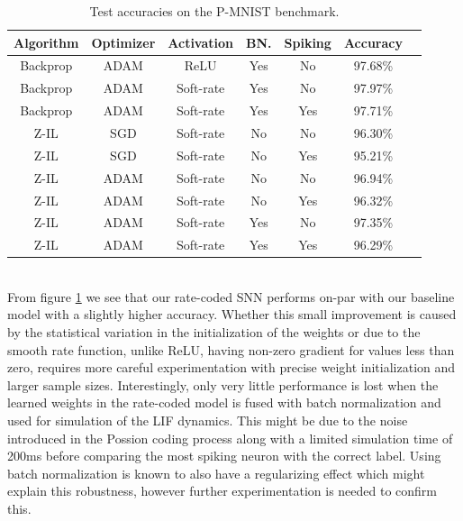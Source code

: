 \documentclass[a4paper,11pt]{article} %
\begin{document}
\begin{table}[ht]
  \centering
  \begin{tabular}{|c | c | c | c | c | c | c |}
  \hline
    \textbf{Algorithm}  & \textbf{Optimizer}  & \textbf{Activation} & \textbf{BN.}  & \textbf{Spiking}   & \textbf{Accuracy}      \\ \hline
    Backprop            & ADAM                & ReLU                & Yes           & No                 & 97.68\%                \\
    Backprop            & ADAM                & Soft-rate           & Yes           & No                 & 97.97\%                \\
    Backprop            & ADAM                & Soft-rate           & Yes           & Yes                & 97.71\%                \\
    Z-IL                & SGD                 & Soft-rate           & No            & No                 & 96.30\%                \\
    Z-IL                & SGD                 & Soft-rate           & No            & Yes                & 95.21\%                \\
    Z-IL                & ADAM                & Soft-rate           & No            & No                 & 96.94\%                \\ 
    Z-IL                & ADAM                & Soft-rate           & No            & Yes                & 96.32\%                \\ 
    Z-IL                & ADAM                & Soft-rate           & Yes           & No                 & 97.35\%                \\ \hline
    Z-IL                & ADAM                & Soft-rate           & Yes           & Yes                & 96.29\%                \\ \hline
  \end{tabular}
  \caption{Test accuracies on the P-MNIST benchmark.}
  \label{fig:snn-accuracies}
\end{table} \\
From figure \ref{fig:snn-accuracies} we see that our rate-coded SNN performs on-par with our baseline model with a slightly higher accuracy. Whether this small improvement is caused by the statistical variation in the initialization of the weights or due to the smooth rate function, unlike ReLU, having non-zero gradient for values less than zero, requires more careful experimentation with precise weight initialization and larger sample sizes. Interestingly, only very little performance is lost when the learned weights in the rate-coded model is fused with batch normalization and used for simulation of the LIF dynamics. This might be due to the noise introduced in the Possion coding process along with a limited simulation time of 200ms before comparing the most spiking neuron with the correct label. Using batch normalization is known to also have a regularizing effect \cite{ioffe2015batch} which might explain this robustness, however further experimentation is needed to confirm this. 
\end{document}
